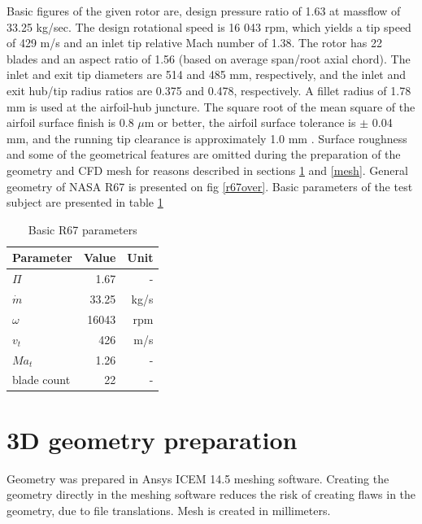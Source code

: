 Basic figures of the given rotor are, design pressure ratio of 1.63 at massflow of 33.25 kg/sec. The design rotational speed is 16 043 rpm, which yields a tip speed of 429 m/s and an inlet tip relative Mach number of 1.38. The rotor has 22 blades and an aspect ratio of 1.56 (based on average span/root axial chord). The inlet and exit tip diameters are 514 and 485 mm, respectively, and the inlet and exit hub/tip radius ratios are 0.375 and 0.478, respectively. A fillet radius of 1.78 mm is used at the airfoil-hub juncture. The square root of the mean square of the airfoil surface finish is 0.8 $\mu${}m or better, the airfoil surface tolerance is $\pm$ 0.04 mm, and the running tip clearance is approximately 1.0 mm \citep{r67laser}. Surface roughness and some of the geometrical features are omitted during the preparation of the geometry and CFD mesh for reasons described in sections \ref{3dgeom} and \ref{mesh}. General geometry of NASA R67 is presented on fig \ref{r67over}. Basic parameters of the test subject are presented in table \ref{tab:data}

\begin{table}[ht!]
\centering
\caption{Basic R67 parameters} \label{tab:data}
\begin{tabular}{@{}lrr@{}}
\toprule
Parameter   & Value & Unit \\ \midrule
$\Pi$          & 1.67  & -    \\
$\dot{m}$      & 33.25 & kg/s \\
$\omega$       & 16043 & rpm  \\
$v_t$          & 426   & m/s  \\
$Ma_t$         & 1.26  & -    \\
blade count    & 22    & -    \\ \bottomrule
\end{tabular}
\end{table}

\section{3D geometry preparation} \label{3dgeom}
Geometry was prepared in Ansys ICEM 14.5 meshing software. Creating the geometry directly in the meshing software reduces the risk of creating flaws in the geometry, due to file translations. Mesh is created in millimeters.

